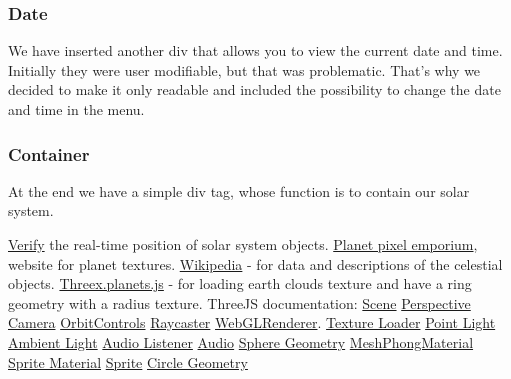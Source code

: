 \documentclass{article}
\begin{document}
\subsubsection{Date}
We have inserted another div that allows you to view the current date and time. Initially they were user modifiable, but that was problematic. That's why we decided to make it only readable and included the possibility to change the date and time in the menu.

\subsubsection{Container}
At the end we have a simple div tag, whose function is to contain our solar system.

\begin{thebibliography}{99}
 \href{https://theskylive.com/3dsolarsystem}{Verify} the real-time position of solar system objects.
 \href{http://planetpixelemporium.com/planets.html}{Planet pixel emporium}, website for planet textures.
 \href{https://www.wikipedia.org/}{Wikipedia} - for data and descriptions of the celestial objects.
 \href{https://github.com/jeromeetienne/threex.planets/blob/master/threex.planets.js}{Threex.planets.js} - for loading earth clouds texture and have a ring geometry with a radius texture.
 ThreeJS documentation: \href{https://threejs.org/docs/#api/en/scenes/Scene}{Scene}
\href{https://threejs.org/docs/#api/en/cameras/PerspectiveCamera}{Perspective Camera}  \href{https://threejs.org/docs/#examples/en/controls/OrbitControls}{OrbitControls} \href{https://threejs.org/docs/#api/en/core/Raycaster}{Raycaster} \href{https://threejs.org/docs/#api/en/renderers/WebGLRenderer}{WebGLRenderer}.
\href{https://threejs.org/docs/#api/en/loaders/TextureLoader}{Texture Loader}
\href{https://threejs.org/docs/#api/en/lights/PointLight}{Point Light}
\href{https://threejs.org/docs/#api/en/lights/AmbientLight}{Ambient Light}
\href{https://threejs.org/docs/#api/en/audio/AudioListener}{Audio Listener}
\href{https://threejs.org/docs/#api/en/audio/Audio}{Audio}
\href{https://threejs.org/docs/#api/en/geometries/SphereGeometry}{Sphere Geometry}
\href{https://threejs.org/docs/#api/en/materials/MeshPhongMaterial}{MeshPhongMaterial}
\href{https://threejs.org/docs/#api/en/materials/SpriteMaterial}{Sprite Material}
\href{https://threejs.org/docs/#api/en/objects/Sprite}{Sprite}
\href{https://threejs.org/docs/#api/en/geometries/CircleGeometry}{Circle Geometry}

\end{thebibliography}
\end{document}
